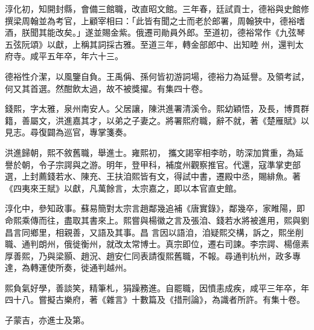 \begin{pinyinscope}
 淳化初，知開封縣，會備三館職，改直昭文館。三年春，廷試貢士，德裕與史館修撰梁周翰並為考官，上顧宰相曰：「此皆有聞之士而老於郎署，周翰狹中，德裕嗜酒，朕聞其能改矣。」遂並賜金紫。俄遷司勛員外郎。至道初，德裕常作《九弦琴五弦阮頌》以獻，上稱其詞採古雅。至道三年，轉金部郎中、出知睦
 州，還判太府寺。咸平五年卒，年六十三。



 德裕性介潔，以風鑒自負。王禹偁、孫何皆初游詞場，德裕力為延譽。及領考試，何又其首選。然酣飲太過，故不被獎擢。有集四十卷。



 錢熙，字太雅，泉州南安人。父居讓，陳洪進署清溪令。熙幼穎悟，及長，博貫群籍，善屬文，洪進嘉其才，以弟之子妻之。將署熙府職，辭不就，著《楚雁賦》以見志。尋復闢為巡官，專掌箋奏。



 洪進歸朝，熙不敘舊職，舉進士。雍熙初，
 攜文謁宰相李昉，昉深加賞重，為延譽於朝，令子宗諤與之游。明年，登甲科，補度州觀察推官。代還，寇準掌吏部選，上封薦錢若水、陳充、王扶洎熙皆有文，得試中書，遷殿中丞，賜緋魚。著《四夷來王賦》以獻，凡萬餘言，太宗嘉之，即以本官直史館。



 淳化中，參知政事。蘇易簡對太宗言趙鄰幾追補《唐實錄》，鄰幾卒，家睢陽，即命熙乘傳而往，盡取其書來上。熙嘗與楊徽之言及張洎、錢若水將被進用，熙與劉昌言同鄉里，相親善，又語及其事。昌
 言因以語洎，洎疑熙交構，訴之，熙坐削職、通判朗州，俄徙衡州，就改太常博士。真宗即位，遷右司諫。李宗諤、楊億素厚善熙，乃與梁顥、趙況、趙安仁同表請復熙舊職，不報。尋通判杭州，政多專達，為轉運使所奏，徙通判越州。



 熙負氣好學，善談笑，精筆札，狷躁務進。自罷職，因憤恚成疾，咸平三年卒，年四十八。嘗擬古樂府，著《雜言》十數篇及《措刑論》，為識者所許。有集十卷。



 子蒙吉，亦進士及第。



\end{pinyinscope}